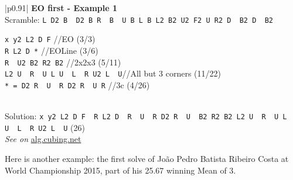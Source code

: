 \documentclass[11pt,a4paper]{book}
\newcommand{\p}{\textquotesingle}
\newcommand{\m}{\texttt}
\newcommand{\ps}{\p\,\,}
\newcommand{\comment}[1]{{\color{gray}\quad//#1}}
\begin{document}
\bigskip
\begin{tabular}{|p{}|}
\hline
\textbf{EO first - Example 1}\\
\hline
Scramble: \m{L D2 B\ps D2 B R\ps B\ps U B L B L2 B2 U2 F2 U R2 D\ps B2 D\ps B2}\\
\hline
\begin{minipage}[l]{0.650\textwidth}
\m{x y2 L2 D F\p} \comment{EO (3/3)}\\
\m{R L2 D *} \comment{EOLine (3/6)}\\
\m{R\ps U2 B2 R2 B2} \comment{2x2x3 (5/11)}\\
\m{L2 U\ps R\ps U L U\ps L\ps R U2 L\ps U\p}\comment{All but 3 corners (11/22)}\\
\m{* = D2 R\ps U\ps R D2 R\ps U R} \comment{3c (4/26)}
\end{minipage}
\begin{minipage}[c]{0.25\textwidth}

\end{minipage}\\
\hline
Solution: \m{x y2 L2 D F\ps R L2 D\ps R\ps U\ps R D2 R\ps U\ps B2 R2 B2 L2 U\ps R\ps U L U\ps L\ps R U2 L\ps U\p} (26)\\
\hline
\emph{See on }\href{https://alg.cubing.net/?setup=L_D2_B-_D2_B_R-_B-_U_B_L_B_L2_B2_U2_F2_U_R2_D-_B2_D-_B2&alg=x_y2_L2_D_F-_\%2F\%2FEO\%0AR_L2_D_\%2F\%2FEOLine\%0A(D2_R-_U-_R_D2_R-_U_R)_R-_U2_B2_R2_B2_\%2F\%2F2x2x3\%0AL2_U-_R-_U_L_U-_L-_R_U2_L-_U-_\%2F\%2FAll_but_3_corners}{alg.cubing.net}\\
\hline
\end{tabular}
\bigskip

Here is another example: the first solve of João Pedro Batista Ribeiro Costa at World Championship 2015, part of his 25.67 winning Mean of 3.
\end{document}

